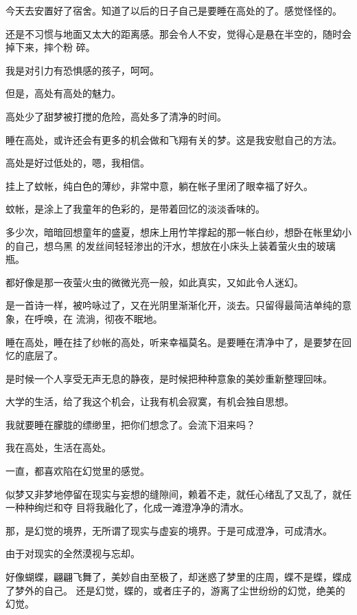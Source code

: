 \documentclass[12pt,a4paper]{article}
\begin{document}
	\endwriting



		今天去安置好了宿舍。知道了以后的日子自己是要睡在高处的了。感觉怪怪的。

		还是不习惯与地面又太大的距离感。那会令人不安，觉得心是悬在半空的，随时会掉下来，摔个粉
	碎。

		我是对引力有恐惧感的孩子，呵呵。

		但是，高处有高处的魅力。

		高处少了甜梦被打搅的危险，高处多了清净的时间。

		睡在高处，或许还会有更多的机会做和飞翔有关的梦。这是我安慰自己的方法。

		高处是好过低处的，嗯，我相信。

		挂上了蚊帐，纯白色的薄纱，非常中意，躺在帐子里闭了眼幸福了好久。

		蚊帐，是涂上了我童年的色彩的，是带着回忆的淡淡香味的。

		多少次，暗暗回想童年的盛夏，想床上用竹竿撑起的那一帐白纱，想卧在帐里幼小的自己，想乌黑
	的发丝间轻轻渗出的汗水，想放在小床头上装着萤火虫的玻璃瓶。

		都好像是那一夜萤火虫的微微光亮一般，如此真实，又如此令人迷幻。

		是一首诗一样，被吟咏过了，又在光阴里渐渐化开，淡去。只留得最简洁单纯的意象，在呼唤，在
	流淌，彻夜不眠地。

		睡在高处，睡在挂了纱帐的高处，听来幸福莫名。是要睡在清净中了，是要梦在回忆的底层了。

		是时候一个人享受无声无息的静夜，是时候把种种意象的美妙重新整理回味。

		大学的生活，给了我这个机会，让我有机会寂寞，有机会独自思想。

		我就要睡在朦胧的缥缈里，把你们想念了。会流下泪来吗？

		我在高处，生活在高处。

	\endwriting



		一直，都喜欢陷在幻觉里的感觉。

		似梦又非梦地停留在现实与妄想的缝隙间，赖着不走，就任心绪乱了又乱了，就任一种种绚烂和夺
	目将我融化了，化成一滩澄净净的清水。

		那，是幻觉的境界，无所谓了现实与虚妄的境界。于是可成澄净，可成清水。

		由于对现实的全然漠视与忘却。

		好像蝴蝶，翩翩飞舞了，美妙自由至极了，却迷惑了梦里的庄周，蝶不是蝶，蝶成了梦外的自己。
	还是幻觉，蝶的，或者庄子的，游离了尘世纷纷的幻觉，绝美的幻觉。
\end{document}
